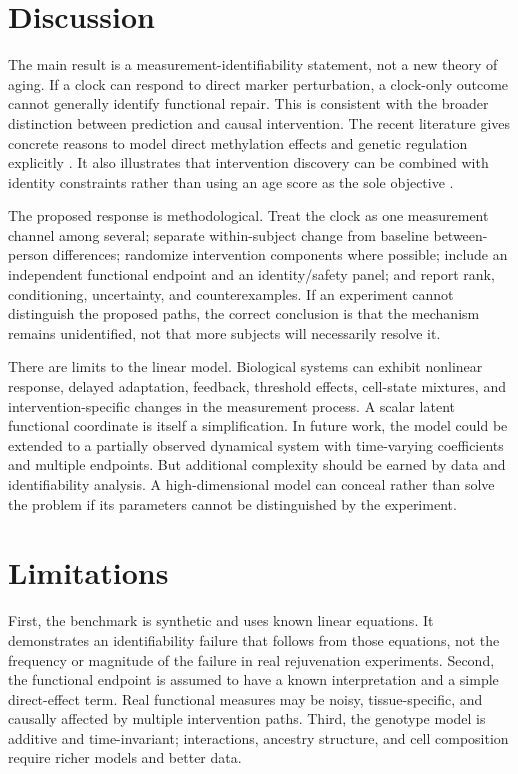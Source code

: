 \documentclass[10pt,a4paper]{article}
\begin{document}
\section{Discussion}
The main result is a measurement-identifiability statement, not a new theory of aging. If a clock can respond to direct marker perturbation, a clock-only outcome cannot generally identify functional repair. This is consistent with the broader distinction between prediction and causal intervention. The recent literature gives concrete reasons to model direct methylation effects and genetic regulation explicitly \citep{liesenfelder2025,lim2026}. It also illustrates that intervention discovery can be combined with identity constraints rather than using an age score as the sole objective \citep{sengstack2026}.

The proposed response is methodological. Treat the clock as one measurement channel among several; separate within-subject change from baseline between-person differences; randomize intervention components where possible; include an independent functional endpoint and an identity/safety panel; and report rank, conditioning, uncertainty, and counterexamples. If an experiment cannot distinguish the proposed paths, the correct conclusion is that the mechanism remains unidentified, not that more subjects will necessarily resolve it.

There are limits to the linear model. Biological systems can exhibit nonlinear response, delayed adaptation, feedback, threshold effects, cell-state mixtures, and intervention-specific changes in the measurement process. A scalar latent functional coordinate is itself a simplification. In future work, the model could be extended to a partially observed dynamical system with time-varying coefficients and multiple endpoints. But additional complexity should be earned by data and identifiability analysis. A high-dimensional model can conceal rather than solve the problem if its parameters cannot be distinguished by the experiment.

\section{Limitations}
First, the benchmark is synthetic and uses known linear equations. It demonstrates an identifiability failure that follows from those equations, not the frequency or magnitude of the failure in real rejuvenation experiments. Second, the functional endpoint is assumed to have a known interpretation and a simple direct-effect term. Real functional measures may be noisy, tissue-specific, and causally affected by multiple intervention paths. Third, the genotype model is additive and time-invariant; interactions, ancestry structure, and cell composition require richer models and better data.
\end{document}
